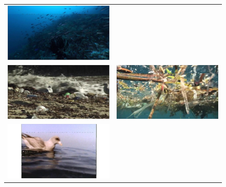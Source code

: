 \begin{figure}[h!tb]
{\begin{tabular}{rl}
%
\colorbox{green!80}{
\includegraphics[keepaspectratio=true,width=\iwith]{images/matrix/2737_10.jpg}}\\
%
\colorbox{red!70}{\colorbox{green!80}{
\includegraphics[keepaspectratio=true,width=\iwith]{images/matrix/31_11.jpg}}}&
%
\colorbox{red!70}{
\includegraphics[keepaspectratio=true,width=\iwith]{images/matrix/4409_01.jpg}}\\
%
\colorbox{green!80}{
\includegraphics[keepaspectratio=true,width=\iwith]{images/matrix/401_10.jpg}}&

\end{tabular}}
\end{figure}

